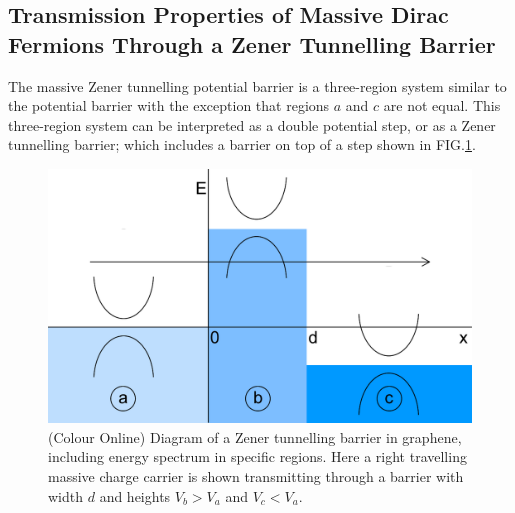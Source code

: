 \documentclass[prl,twocolumn,aps,superscriptaddress,floatfix,10pt]{revtex4}
\begin{document}
\subsection{Transmission Properties of Massive Dirac Fermions Through a Zener Tunnelling Barrier}
	The massive Zener tunnelling potential barrier is a three-region system similar to the potential barrier with the exception that regions $a$ and $c$ are not equal. This three-region system can be interpreted as a double potential step, or as a Zener tunnelling barrier; which includes a barrier on top of a step shown in FIG.\ref{asy-flat}.
\begin{figure}
	\includegraphics[scale=0.2]{asy-flat}
	\caption{(Colour Online) Diagram of a Zener tunnelling barrier in graphene, including energy spectrum in specific regions. Here a right travelling massive charge carrier is shown transmitting through a barrier with width $d$ and heights $V_{b}>V_{a}$ and $V_{c}<V_{a}$.}
	\label{asy-flat}
\end{figure}
\end{document}
